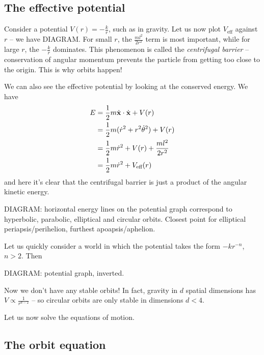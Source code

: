\documentclass{../template/note}
\begin{document}
    \subsection{The effective potential}

    Consider a potential \(V(r) = -\frac k r\), such as in gravity. Let us now plot \(V_\text{eff}\) against \(r\) -- we have DIAGRAM. For small \(r\), the \(\frac{ml^2}{2r^2}\) term is most important, while for large \(r\), the \(-\frac k r\) dominates. This phenomenon is called the \emph{centrifugal barrier} -- conservation of angular momentum prevents the particle from getting too close to the origin. This is why orbits happen!

    We can also see the effective potential by looking at the conserved energy. We have
    \begin{align*}
        E &= \frac 1 2 m \dot{\V x} \cdot \dot{\V x} + V(r) \\
        &= \frac 1 2 m(\dot{r}^2 + r^2 \dot{\theta}^2) + V(r) \\
        &= \frac 1 2 m\dot{r}^2 + V(r) + \frac{ml^2}{2r^2} \\
        &= \frac 1 2 m\dot{r}^2 + V_\text{eff}(r)
    \end{align*}
    and here it's clear that the centrifugal barrier is just a product of the angular kinetic energy.

    DIAGRAM: horizontal energy lines on the potential graph correspond to hyperbolic, parabolic, elliptical and circular orbits. Closest point for elliptical periapsis/perihelion, furthest apoapsis/aphelion.

    Let us quickly consider a world in which the potential takes the form \(-kr^{-n}\), \(n > 2\). Then

    DIAGRAM: potential graph, inverted.

    Now we don't have any stable orbits! In fact, gravity in \(d\) spatial dimensions has \(V \propto \frac 1 {r^{d-2}}\) -- so circular orbits are only stable in dimensions \(d < 4\).

    Let us now solve the equations of motion.

    \subsection{The orbit equation}
\end{document}
